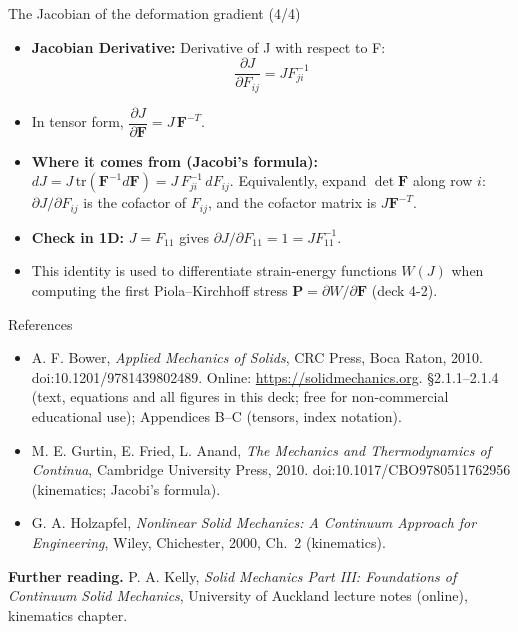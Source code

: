 \documentclass[aspectratio=169,11pt]{beamer}
\begin{document}
\begin{frame}{The Jacobian of the deformation gradient (4/4)}
\begin{itemize}
    \item \textbf{Jacobian Derivative:} Derivative of J with respect to F:
        \[
        \frac{\partial J}{\partial F_{ij}} = J F_{ji}^{-1}
        \]
    \item In tensor form, $\dfrac{\partial J}{\partial \mathbf{F}} = J\,\mathbf{F}^{-T}$.
    \item \textbf{Where it comes from (Jacobi's formula):} $dJ = J\,\mathrm{tr}\!\left(\mathbf{F}^{-1}d\mathbf{F}\right) = J\,F^{-1}_{ji}\,dF_{ij}$. Equivalently, expand $\det\mathbf{F}$ along row $i$: $\partial J/\partial F_{ij}$ is the cofactor of $F_{ij}$, and the cofactor matrix is $J\mathbf{F}^{-T}$.
    \item \textbf{Check in 1D:} $J=F_{11}$ gives $\partial J/\partial F_{11} = 1 = J F_{11}^{-1}$.
    \item This identity is used to differentiate strain-energy functions $W(J)$ when computing the first Piola--Kirchhoff stress $\mathbf{P}=\partial W/\partial\mathbf{F}$ (deck 4-2).
\end{itemize}
\end{frame}

\begin{frame}{References}
\scriptsize
\begin{itemize}
  \item A. F. Bower, \emph{Applied Mechanics of Solids}, CRC Press, Boca Raton, 2010. doi:10.1201/9781439802489. Online: \url{https://solidmechanics.org}. \S2.1.1--2.1.4 (text, equations and all figures in this deck; free for non-commercial educational use); Appendices B--C (tensors, index notation).
  \item M. E. Gurtin, E. Fried, L. Anand, \emph{The Mechanics and Thermodynamics of Continua}, Cambridge University Press, 2010. doi:10.1017/CBO9780511762956 (kinematics; Jacobi's formula).
  \item G. A. Holzapfel, \emph{Nonlinear Solid Mechanics: A Continuum Approach for Engineering}, Wiley, Chichester, 2000, Ch.~2 (kinematics).
\end{itemize}
\medskip
\textbf{Further reading.} P. A. Kelly, \emph{Solid Mechanics Part III: Foundations of Continuum Solid Mechanics}, University of Auckland lecture notes (online), kinematics chapter.
\end{frame}

  
\end{document}
